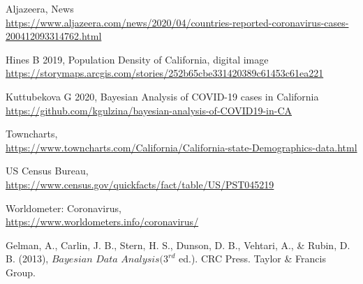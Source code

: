 \documentclass[11pt,twocolumn]{asaproc}
\begin{document}

\begin{references}
\itemsep=0pt
{\footnotesize

\item
Aljazeera, News
\\\url{https://www.aljazeera.com/news/2020/04/countries-reported-coronavirus-cases-200412093314762.html}

\item
Hines B 2019, Population Density of California, digital image
\\\url{https://storymaps.arcgis.com/stories/252b65cbe331420389c61453c61ea221}

\item
Kuttubekova G 2020, Bayesian Analysis of COVID-19 cases in California
\\\url{https://github.com/kgulzina/bayesian-analysis-of-COVID19-in-CA}

\item
Towncharts,
\\\url{https://www.towncharts.com/California/California-state-Demographics-data.html}

\item 
US Census Bureau,
\\\url{https://www.census.gov/quickfacts/fact/table/US/PST045219}

\item 
Worldometer: Coronavirus,
\\\url{https://www.worldometers.info/coronavirus/}


\item 
Gelman, A., Carlin, J. B., Stern, H. S., Dunson, D. B., Vehtari, A., \& Rubin, D. B. (2013), $\textit{Bayesian Data Analysis} (3^{rd}$ ed.). CRC Press. Taylor \& Francis Group.


}
\end{references}
\end{document}
